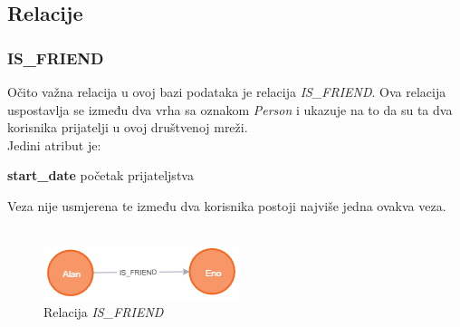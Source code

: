 \documentclass[titlepage, 12pt]{scrartcl}
\begin{document}
	\subsection{Relacije}
	\subsubsection{IS\_FRIEND}
	Očito važna relacija u ovoj bazi podataka je relacija \emph{IS\_FRIEND}. Ova relacija uspostavlja se između dva vrha sa oznakom \emph{Person} i ukazuje na to da su ta dva korisnika prijatelji u ovoj društvenoj mreži. \\
	Jedini atribut je:
	\begin{itemize}
	\end{itemize}
	Veza nije usmjerena te između dva korisnika postoji najviše jedna ovakva veza. \\ \\
	
	\begin{figure}[h]
		\centering
		\includegraphics[scale=0.7]{slike/IS_FRIEND.png}
		\caption{Relacija \emph{IS\_FRIEND}}
		\label{fig:friendship}
	\end{figure}
	
\end{document}
